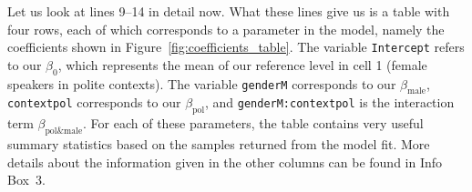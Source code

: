 \documentclass[nobib]{tufte-handout}
\begin{document}
Let us look at lines 9--14 in detail now. What these lines give us is a table with four rows, each of which corresponds to a parameter in the model, namely the coefficients shown in Figure~\ref{fig:coefficients_table}. The variable \texttt{Intercept} refers to our $\beta_0$, which represents the mean of our reference level in cell 1 (female speakers in polite contexts). The variable \texttt{genderM} corresponds to our $\beta_{\text{male}}$, \texttt{contextpol} corresponds to our $\beta_{\text{pol}}$, and \texttt{genderM:contextpol} is the interaction term $\beta_{\text{pol\&male}}$. For each of these parameters, the table contains very useful summary statistics based on the samples returned from the model fit.
%
%
More details about the information given in the other columns can be found in Info Box~3.
\end{document}
